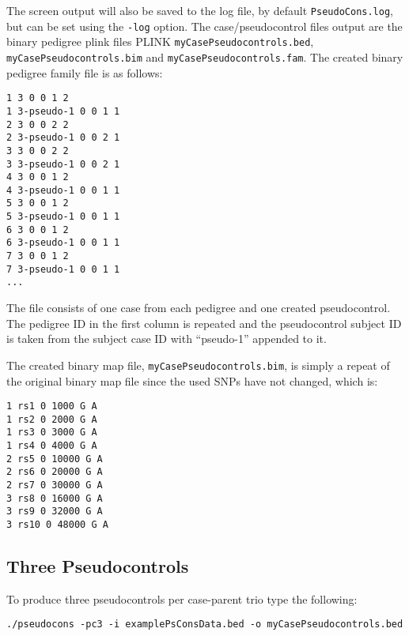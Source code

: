 \documentclass[a4paper,12pt]{article}
\newcommand{\code}[1]{{\footnotesize{{\tt #1}}}}
\begin{document}
The screen output will also be saved to the log file, by default \code{PseudoCons.log}, but can be set using the \code{-log} option. The case/pseudocontrol files output are the binary pedigree plink files PLINK \code{myCasePseudocontrols.bed}, \code{myCasePseudocontrols.bim} and \code{myCasePseudocontrols.fam}. The created binary pedigree family file is as follows: 
\begin{verbatim}
1 3 0 0 1 2
1 3-pseudo-1 0 0 1 1
2 3 0 0 2 2
2 3-pseudo-1 0 0 2 1
3 3 0 0 2 2
3 3-pseudo-1 0 0 2 1
4 3 0 0 1 2
4 3-pseudo-1 0 0 1 1
5 3 0 0 1 2
5 3-pseudo-1 0 0 1 1
6 3 0 0 1 2
6 3-pseudo-1 0 0 1 1
7 3 0 0 1 2
7 3-pseudo-1 0 0 1 1
...
\end{verbatim}

The file consists of one case from each pedigree and one created pseudocontrol. The pedigree ID in the first column is repeated and the pseudocontrol subject ID is taken from the subject case ID with ``pseudo-1'' appended to it. 

The created binary map file, \code{myCasePseudocontrols.bim}, is simply a repeat of the original binary map file since the used SNPs have not changed, which is: 
\begin{verbatim}
1 rs1 0 1000 G A
1 rs2 0 2000 G A
1 rs3 0 3000 G A
1 rs4 0 4000 G A
2 rs5 0 10000 G A
2 rs6 0 20000 G A
2 rs7 0 30000 G A
3 rs8 0 16000 G A
3 rs9 0 32000 G A
3 rs10 0 48000 G A
\end{verbatim}


\subsection{Three Pseudocontrols}
\label{eg-pseudocons3}

To produce three pseudocontrols per case-parent trio type the following: 
\begin{verbatim}
./pseudocons -pc3 -i examplePsConsData.bed -o myCasePseudocontrols.bed
\end{verbatim}
\end{document}
